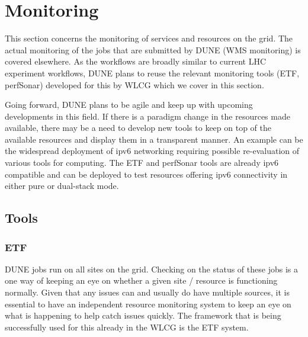 \documentclass[../main-v1.tex]{subfiles}
\begin{document}
\chapter{Monitoring }
\label{ch:mon}

\FPadd\MonEtfTotalPeople\MonEtfOpsPeople\MonEtfDevPeople %

This section concerns the monitoring of services and resources on the grid. The actual monitoring of the jobs that are submitted by DUNE (WMS monitoring) is covered elsewhere. As the workflows are broadly similar to current LHC experiment workflows, DUNE plans to reuse the relevant monitoring tools (ETF, perfSonar) developed for this by WLCG which we cover in this section.

Going forward, DUNE plans to be agile and keep up with upcoming developments in this field. If there is a paradigm change in the resources made available, there may be a need to develop new tools to keep on top of the available resources and display them in a transparent manner. An example can be the widespread deployment of ipv6\cite{bib:ipv6TaskForce} networking requiring possible re-evaluation of various tools for computing. The ETF and perfSonar tools are already ipv6 compatible and can be deployed to test resources offering ipv6 connectivity in either pure or dual-stack mode.

\section{Tools}
\label{sec:mon:xyz}  %
\subsection{ETF}

DUNE jobs run on all sites on the grid. Checking on the status of these jobs is a one way of keeping an eye on whether a given site / resource is functioning normally. Given that any issues can and usually do have multiple sources, it is essential to have an independent resource monitoring system to keep an eye on what is happening to help catch issues quickly. The framework that is being successfully used for this already in the WLCG is the ETF system.
\end{document}
